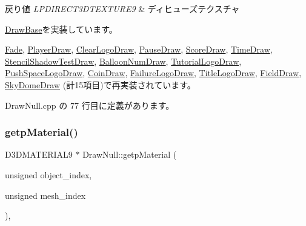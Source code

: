 \begin{DoxyRetVals}{戻り値}
{\em L\+P\+D\+I\+R\+E\+C\+T3\+D\+T\+E\+X\+T\+U\+R\+E9} & ディヒューズテクスチャ \\
\hline
\end{DoxyRetVals}


\mbox{\hyperlink{class_draw_base_a96e94272903d6b663463e0f49246d959}{Draw\+Base}}を実装しています。



\mbox{\hyperlink{class_fade_ab971b8bb17f81d73e0405291a6512a39}{Fade}}, \mbox{\hyperlink{class_player_draw_a3abcf6fb159e94ca4e5785b572e0af11}{Player\+Draw}}, \mbox{\hyperlink{class_clear_logo_draw_adbf4078e91bef05bf5a366adcda744a3}{Clear\+Logo\+Draw}}, \mbox{\hyperlink{class_pause_draw_a191f46de3bb829ab30fca52f902c1df9}{Pause\+Draw}}, \mbox{\hyperlink{class_score_draw_a8736a0044e8a2a6258c396bfed4d1ce8}{Score\+Draw}}, \mbox{\hyperlink{class_time_draw_ac844c99a6d5cdcad9c541779a0e99b22}{Time\+Draw}}, \mbox{\hyperlink{class_stencil_shadow_test_draw_a5c74550a8e0eccf29f3c93e5027e492e}{Stencil\+Shadow\+Test\+Draw}}, \mbox{\hyperlink{class_balloon_num_draw_a1bf5721e82b99cdfd5550262f560da95}{Balloon\+Num\+Draw}}, \mbox{\hyperlink{class_tutorial_logo_draw_a80a3858068af2dcbd1ffc7e59c212924}{Tutorial\+Logo\+Draw}}, \mbox{\hyperlink{class_push_space_logo_draw_a0b4de9ad688997090ab6ab4925e1f5d8}{Push\+Space\+Logo\+Draw}}, \mbox{\hyperlink{class_coin_draw_a38a4143f2e93a5b16d33ec94a188f4f6}{Coin\+Draw}}, \mbox{\hyperlink{class_failure_logo_draw_a3247b4c8de4cb8a8af0ca9dfaf85018b}{Failure\+Logo\+Draw}}, \mbox{\hyperlink{class_title_logo_draw_a4e3da42496afc69f31731e8abfb27380}{Title\+Logo\+Draw}}, \mbox{\hyperlink{class_field_draw_a8e4ea02d9efb9895a0172c29a91d0fb2}{Field\+Draw}}, \mbox{\hyperlink{class_sky_dome_draw_aaa9db229fadd7d4c041afa5436a584af}{Sky\+Dome\+Draw}} (計15項目)で再実装されています。



 Draw\+Null.\+cpp の 77 行目に定義があります。

\mbox{\label{class_draw_null_a0c1efe55fea325ad277594be6fe1e938}} 
\subsubsection{\texorpdfstring{getp\+Material()}{getpMaterial()}}
{\footnotesize\ttfamily D3\+D\+M\+A\+T\+E\+R\+I\+A\+L9 $\ast$ Draw\+Null\+::getp\+Material (\begin{DoxyParamCaption}\item[{unsigned}]{object\+\_\+index,  }\item[{unsigned}]{mesh\+\_\+index }\end{DoxyParamCaption})\hspace{0.3cm}{\ttfamily [override]}, {\ttfamily [virtual]}}



